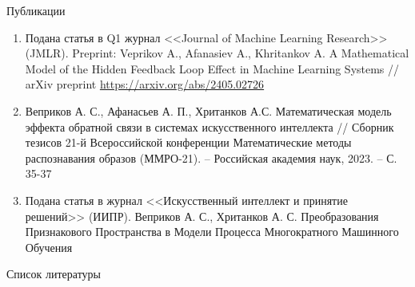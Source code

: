 \documentclass{beamer}
\begin{document}
\begin{frame}{Публикации}
    \begin{enumerate}
        \item Подана статья в Q1 журнал <<Journal of Machine Learning Research>> (JMLR). Preprint: Veprikov A.,   Afanasiev A., Khritankov A. A Mathematical Model of the Hidden Feedback Loop Effect in Machine Learning Systems // arXiv preprint \url{https://arxiv.org/abs/2405.02726}

        \item Веприков А. С., Афанасьев А. П., Хританков А.С. Математическая модель эффекта обратной связи в системах искусственного интеллекта // Сборник тезисов 21-й Всероссийской конференции Математические методы распознавания образов (ММРО-21). – Российская академия наук, 2023. – С. 35-37 

        \item Подана статья в журнал <<Искусственный интеллект и принятие решений>> (ИИПР). Веприков А. С., Хританков А. С. 
        Преобразования Признакового Пространства в Модели Процесса Многократного Машинного Обучения
    \end{enumerate}
\end{frame}
\begin{frame}{Список литературы}
    \footnotesize
    
    
\end{frame}
\end{document}
